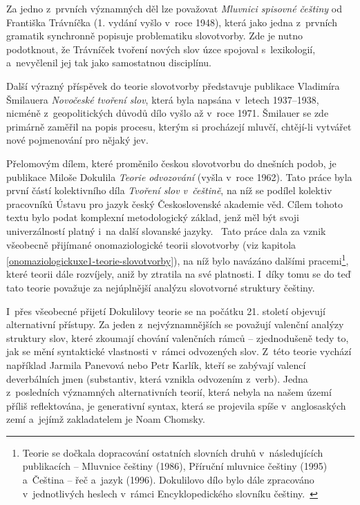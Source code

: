 Za jedno z~prvních významných děl lze považovat \emph{Mluvnici spisovné
češtiny} od Františka Trávníčka (1. vydání vyšlo v~roce 1948), která
jako jedna z~prvních gramatik synchronně popisuje problematiku
slovotvorby. Zde je nutno podotknout, že Trávníček tvoření nových slov
úzce spojoval s~lexikologií, a~nevyčlenil jej tak jako samostatnou
disciplínu.~\parencite[263]{rousinova07}

Další výrazný příspěvek do teorie slovotvorby představuje publikace
Vladimíra Šmilauera \emph{Novočeské tvoření slov}, která byla napsána
v~letech 1937--1938, nicméně z~geopolitických důvodů dílo vyšlo až v~roce
1971. Šmilauer se zde primárně zaměřil na popis procesu, kterým si
procházejí mluvčí, chtějí-li vytvářet nové pojmenování pro nějaký jev.
\parencite[265]{rousinova07}

Přelomovým dílem, které proměnilo českou slovotvorbu do dnešních podob,
je publikace Miloše Dokulila \emph{Teorie odvozování} (vyšla v~roce
1962). Tato práce byla první částí kolektivního díla \emph{Tvoření slov
v~češtině}, na níž se podílel kolektiv pracovníků Ústavu pro jazyk český
Československé akademie věd. Cílem tohoto textu bylo podat komplexní
metodologický základ, jenž měl být svoji univerzálností platný i~na
další slovanské jazyky.~\parencite[267]{rousinova07} Tato práce dala za
vznik všeobecně přijímané onomaziologické teorii slovotvorby (viz
kapitola \ref{onomaziologickuxe1-teorie-slovotvorby}), na níž bylo
navázáno dalšími
pracemi\footnote{Teorie se dočkala dopracování ostatních slovních druhů v~následujících publikacích -- Mluvnice češtiny (1986), Příruční mluvnice češtiny (1995) a~Čeština -- řeč a~jazyk (1996). Dokulilovo dílo bylo dále zpracováno v~jednotlivých heslech v~rámci Encyklopedického slovníku češtiny.~\parencite[272]{rousinova07}},
které teorii dále rozvíjely, aniž by ztratila na své platnosti.
\parencite[272]{rousinova07} I~díky tomu se do teď tato teorie považuje
za nejúplnější analýzu slovotvorné struktury češtiny.
\parencite[273]{zikova07}

I~přes všeobecné přijetí Dokulilovy teorie se na počátku 21. století
objevují alternativní přístupy. Za jeden z~nejvýznamnějších se považují
valenční analýzy struktury slov, které zkoumají chování valenčních rámců
-- zjednodušeně tedy to, jak se mění syntaktické vlastnosti v~rámci
odvozených slov. Z~této teorie vychází například Jarmila Panevová nebo
Petr Karlík, kteří se zabývají valencí deverbálních jmen (substantiv,
která vznikla odvozením z~verb). Jedna z~posledních významných
alternativních teorií, která nebyla na našem území příliš reflektována,
je generativní syntax, která se projevila spíše v~anglosaských zemí
a~jejímž zakladatelem je Noam Chomsky.~\parencite[274--275]{zikova07}

